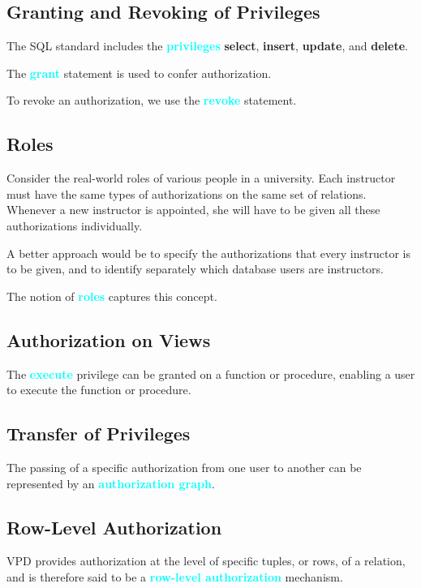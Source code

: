 \documentclass[a4paper,12pt,twoside,openany]{book}
\newcommand{\textcy}[1]{\textbf{\textcolor{cyan}{#1}}}
\begin{document}
\subsection{Granting and Revoking of Privileges}

The SQL standard includes the \textcy{privileges} \textbf{select}, \textbf{insert}, \textbf{update}, and \textbf{delete}.

The \textcy{grant} statement is used to confer authorization.

To revoke an authorization, we use the \textcy{revoke} statement.

\subsection{Roles}

Consider the real-world roles of various people in a university. Each instructor must have the same types of authorizations on the same set of relations. Whenever a new instructor is appointed, she will have to be given all these authorizations individually.

A better approach would be to specify the authorizations that every instructor is to be given, and to identify separately which database users are instructors.

The notion of \textcy{roles} captures this concept.

\subsection{Authorization on Views}

The \textcy{execute} privilege can be granted on a function or procedure, enabling a user to execute the function or procedure.

\subsection{Transfer of Privileges}

The passing of a specific authorization from one user to another can be represented by an \textcy{authorization graph}.

\subsection{Row-Level Authorization}

VPD provides authorization at the level of specific tuples, or rows, of a relation, and is therefore said to be a \textcy{row-level authorization} mechanism.
\end{document}
